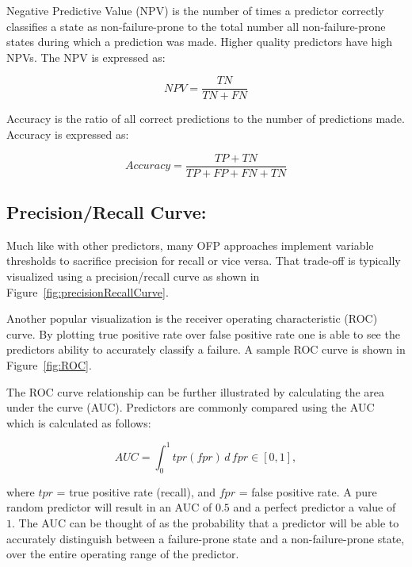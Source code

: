 Negative Predictive Value (NPV) is the number of times a predictor correctly
classifies a state as non-failure-prone to the total number all
non-failure-prone states during which a prediction was made.  Higher quality
predictors have high NPVs.  The NPV is expressed as:

\[ \mathit{NPV}
	= \dfrac{TN}{TN + FN}
\]

Accuracy is the ratio of all correct predictions to the number of predictions
made.  Accuracy is expressed as:

\[ Accuracy 
	= \dfrac{TP + TN}{TP + FP + FN + TN}
\]

\subsection{Precision/Recall Curve:}
Much like with other predictors, many OFP approaches implement variable
thresholds to sacrifice precision for recall or vice versa.  That trade-off is
typically visualized using a precision/recall curve as shown in
Figure~\ref{fig:precisionRecallCurve}.

\figprecisionRecallCurve{3in}

Another popular visualization is the receiver operating characteristic (ROC)
curve.  By plotting true positive rate over false positive rate one is able to
see the predictors ability to accurately classify a failure.  A sample ROC
curve is shown in Figure~\ref{fig:ROC}.

\figROC{3in}

The ROC curve relationship can be further illustrated by calculating the area
under the curve (AUC).  Predictors are commonly compared using the AUC which is
calculated as follows:

$$AUC = \int_{0}^{1} \mathit{tpr}(\mathit{fpr}) \,d\,\mathit{fpr} \in [0,1],$$

\noindent
where $tpr$ = true positive rate (recall), and $fpr$ = false positive rate.  A
pure random predictor will result in an AUC of $0.5$ and a perfect predictor a
value of~$1$.  The AUC can be thought of as the probability that a predictor
will be able to accurately distinguish between a failure-prone state and a
non-failure-prone state, over the entire operating range of the predictor.

